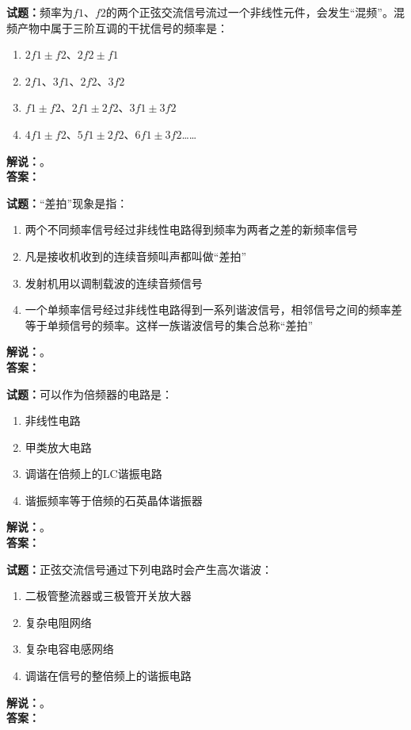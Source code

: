 \documentclass{ctexbook}
\begin{document}
\bigskip

\noindent\textbf{试题：}频率为\(f1\)、\(f2\)的两个正弦交流信号流过一个非线性元件，会发生“混频”。混频产物中属于三阶互调的干扰信号的频率是：
\begin{enumerate}[leftmargin=3em]
  \item \(2f1\pm f2\)、\(2f2\pm f1\)
  \item \(2f1\)、\(3f1\)、\(2f2\)、\(3f2\)
  \item \(f1\pm f2\)、\(2f1\pm 2f2\)、\(3f1\pm 3f2\)
  \item \(4f1\pm f2\)、\(5f1\pm 2f2\)、\(6f1\pm 3f2\)……
\end{enumerate}
\noindent\textbf{解说：}\textbf{}。\\\noindent\textbf{答案：}

\bigskip

\noindent\textbf{试题：}“差拍”现象是指：
\begin{enumerate}[leftmargin=3em]
  \item 两个不同频率信号经过非线性电路得到频率为两者之差的新频率信号
  \item 凡是接收机收到的连续音频叫声都叫做“差拍”
  \item 发射机用以调制载波的连续音频信号
  \item 一个单频率信号经过非线性电路得到一系列谐波信号，相邻信号之间的频率差等于单频信号的频率。这样一族谐波信号的集合总称“差拍”
\end{enumerate}
\noindent\textbf{解说：}\textbf{}。\\\noindent\textbf{答案：}

\bigskip

\noindent\textbf{试题：}可以作为倍频器的电路是：
\begin{enumerate}[leftmargin=3em]
  \item 非线性电路
  \item 甲类放大电路
  \item 调谐在倍频上的LC谐振电路
  \item 谐振频率等于倍频的石英晶体谐振器
\end{enumerate}
\noindent\textbf{解说：}\textbf{}。\\\noindent\textbf{答案：}

\bigskip

\noindent\textbf{试题：}正弦交流信号通过下列电路时会产生高次谐波：
\begin{enumerate}[leftmargin=3em]
  \item 二极管整流器或三极管开关放大器
  \item 复杂电阻网络
  \item 复杂电容电感网络
  \item 调谐在信号的整倍频上的谐振电路
\end{enumerate}
\noindent\textbf{解说：}\textbf{}。\\\noindent\textbf{答案：}
\end{document}
